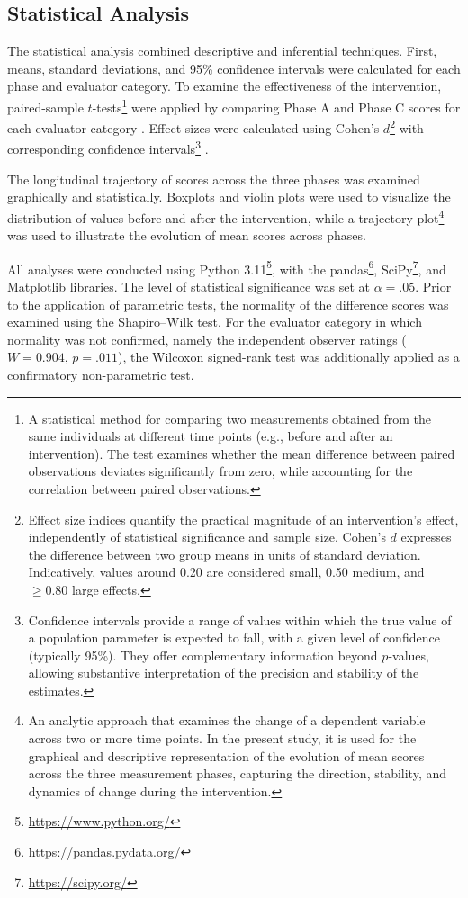 \documentclass[journal]{IEEEtran}
\begin{document}
\subsection{Statistical Analysis}

The statistical analysis combined descriptive and inferential techniques. First, means, standard deviations, and 95\% confidence intervals were calculated for each phase and evaluator category. To examine the effectiveness of the intervention, paired-sample $t$-tests\footnote{A statistical method for comparing two measurements obtained from the same individuals at different time points (e.g., before and after an intervention). The test examines whether the mean difference between paired observations deviates significantly from zero, while accounting for the correlation between paired observations.} were applied by comparing Phase A and Phase C scores for each evaluator category \cite{student1908}. Effect sizes were calculated using Cohen's $d$\footnote{Effect size indices quantify the practical magnitude of an intervention's effect, independently of statistical significance and sample size. Cohen's $d$ expresses the difference between two group means in units of standard deviation. Indicatively, values around 0.20 are considered small, 0.50 medium, and $\geq 0.80$ large effects.} with corresponding confidence intervals\footnote{Confidence intervals provide a range of values within which the true value of a population parameter is expected to fall, with a given level of confidence (typically 95\%). They offer complementary information beyond $p$-values, allowing substantive interpretation of the precision and stability of the estimates.} \cite{cohen1988}.

The longitudinal trajectory of scores across the three phases was examined graphically and statistically. Boxplots and violin plots were used to visualize the distribution of values before and after the intervention, while a trajectory plot\footnote{An analytic approach that examines the change of a dependent variable across two or more time points. In the present study, it is used for the graphical and descriptive representation of the evolution of mean scores across the three measurement phases, capturing the direction, stability, and dynamics of change during the intervention.} was used to illustrate the evolution of mean scores across phases.

All analyses were conducted using Python 3.11\footnote{\url{https://www.python.org/}}, with the pandas\footnote{\url{https://pandas.pydata.org/}}, SciPy\footnote{\url{https://scipy.org/}}, and Matplotlib libraries. The level of statistical significance was set at $\alpha=.05$. Prior to the application of parametric tests, the normality of the difference scores was examined using the Shapiro--Wilk test. For the evaluator category in which normality was not confirmed, namely the independent observer ratings ($W=0.904$, $p=.011$), the Wilcoxon signed-rank test was additionally applied as a confirmatory non-parametric test.
\end{document}
